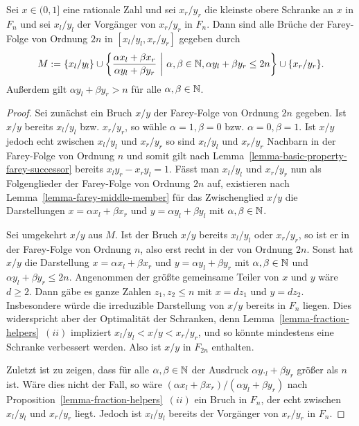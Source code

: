 \begin{lemma}\label{lemma-candidates-next-farey-bound}
	Sei $x\in(0,1]$ eine rationale Zahl und sei $x_r/y_r$ die kleinste obere Schranke an $x$ in $F_n$ und sei $x_l/y_l$ der Vorgänger von $x_r/y_r$ in $F_n$.
	Dann sind alle Brüche der Farey-Folge von Ordnung $2n$ in $[x_l/y_l, x_r/y_r]$ gegeben durch
	\[
		M:= \{ x_l/y_l \} \cup \left\{ \frac{\alpha x_l + \beta x_r}{\alpha y_l + \beta y_r} ~\middle\vert~ \alpha,\beta\in\mathbb{N}, \alpha y_l + \beta y_r\leq 2n \right\} \cup \{ x_r/y_r \}.
	\]
	Außerdem gilt $\alpha y_l + \beta y_r > n$ für alle $\alpha,\beta \in\mathbb{N}$.
\end{lemma}
\begin{proof}
	Sei zunächst ein Bruch $x/y$ der Farey-Folge von Ordnung $2n$ gegeben.
	Ist $x/y$ bereits $x_l/y_l$ bzw. $x_r/y_r$, so wähle $\alpha = 1, \beta = 0$ bzw. $\alpha = 0, \beta = 1$.
	Ist $x/y$ jedoch echt zwischen $x_l/y_l$ und $x_r/y_r$ so sind $x_l/y_l$ und $x_r/y_r$ Nachbarn in der Farey-Folge von Ordnung $n$ und somit gilt nach Lemma~\ref{lemma-basic-property-farey-successor} bereits $x_ly_r - x_ry_l = 1$.
	Fässt man $x_l/y_l$ und $x_r/y_r$ nun als Folgenglieder der Farey-Folge von Ordnung $2n$ auf, existieren nach Lemma~\ref{lemma-farey-middle-member} für das Zwischenglied $x/y$ die Darstellungen $x = \alpha x_l + \beta x_r$ und $y= \alpha y_l + \beta y_l$ mit $\alpha, \beta \in\mathbb{N}$.
	
	Sei umgekehrt $x/y$ aus $M$.
	Ist der Bruch $x/y$ bereits $x_l/y_l$ oder $x_r/y_r$, so ist er in der Farey-Folge von Ordnung $n$, also erst recht in der von Ordnung $2n$.
	Sonst hat $x/y$ die Darstellung $x=\alpha x_l + \beta x_r$ und $y=\alpha y_l + \beta y_r$ mit $\alpha,\beta\in\mathbb{N}$ und $\alpha y_l + \beta y_r \leq 2n$.
	Angenommen der größte gemeinsame Teiler von $x$ und $y$ wäre $d\geq 2$.
	Dann gäbe es ganze Zahlen $z_1, z_2 \leq n$ mit $x=d z_1$ und $y=d z_2$.
	Insbesondere würde die irreduzible Darstellung von $x/y$ bereits in $F_n$ liegen.
	Dies widerspricht aber der Optimalität der Schranken, denn Lemma~\ref{lemma-fraction-helpers}~$(ii)$ impliziert $x_l / y_l < x/y < x_r/y_r$, und so könnte mindestens eine Schranke verbessert werden.
	Also ist $x/y$ in $F_{2n}$ enthalten.
	
	Zuletzt ist zu zeigen, dass für alle $\alpha,\beta\in\mathbb{N}$ der Ausdruck $\alpha y._l + \beta y_r$ größer als $n$ ist.
	Wäre dies nicht der Fall, so wäre $(\alpha x_l + \beta x_r) / (\alpha y_l + \beta y_r)$ nach Proposition~\ref{lemma-fraction-helpers}~$(ii)$ ein Bruch in $F_n$, der echt zwischen $x_l/y_l$ und $x_r/y_r$ liegt.
	Jedoch ist $x_l/y_l$ bereits der Vorgänger von $x_r/y_r$ in $F_n$.
\end{proof}

